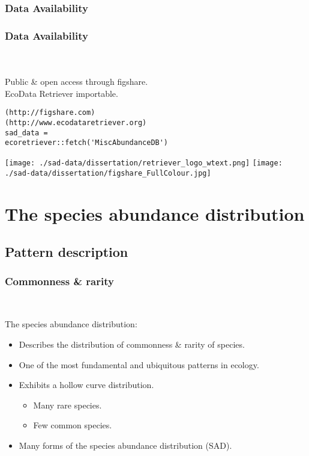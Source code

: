 \documentclass[14pt]{beamer}
\begin{document}
\subsubsection{Data Availability}
\begin{frame}[fragile]
\frametitle{Data Availability}
~\\
~\\
Public \& open access through figshare.\\
EcoData Retriever importable.\\
\begin{verbatim}
(http://figshare.com)
(http://www.ecodataretriever.org)
sad_data = 
ecoretriever::fetch('MiscAbundanceDB')
\end{verbatim}
\texttt{[image: ./sad-data/dissertation/retriever\_logo\_wtext.png]}
\texttt{[image: ./sad-data/dissertation/figshare\_FullColour.jpg]}
\end{frame}

\section{The species abundance distribution}
\subsection{Pattern description}
\begin{frame}[t]{}
\frametitle{Commonness \& rarity}
~\\
\begin{large}
The species abundance distribution:
\end{large}
\begin{itemize}
\item Describes the distribution of commonness \& rarity of species.
\item One of the most fundamental and ubiquitous patterns in ecology.
\item Exhibits a hollow curve distribution.
\begin{itemize}
\item Many rare species.
\item Few common species.
~\\
\end{itemize}
\item Many forms of the species abundance distribution (SAD).
\end{itemize}
\end{frame}
\end{document}
